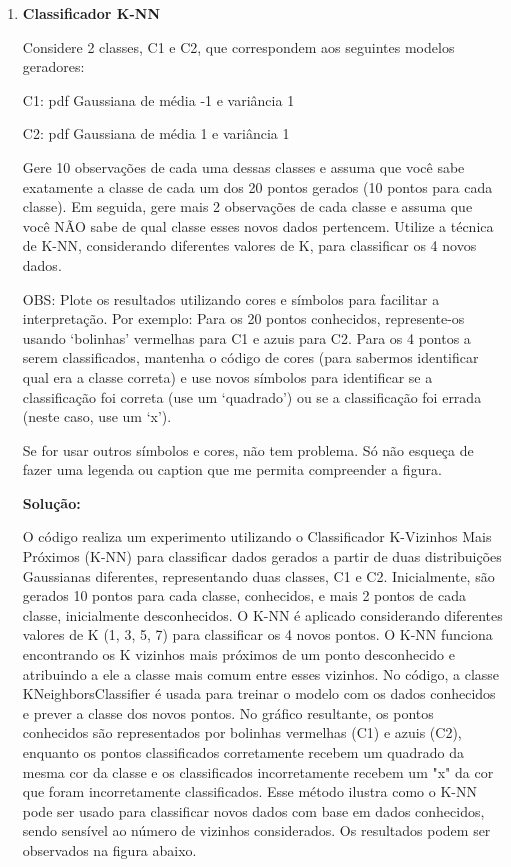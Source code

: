 \begin{enumerate}[label=E\arabic*]

\item \textbf{Classificador K-NN} \par
Considere 2 classes, C1 e C2, que correspondem aos seguintes modelos geradores: 

C1: pdf Gaussiana de média -1 e variância 1

C2: pdf Gaussiana de média 1 e variância 1

Gere 10 observações de cada uma dessas classes e assuma que você sabe exatamente a classe de cada um dos 20 pontos gerados (10 pontos para cada classe). Em seguida, gere mais 2 observações de cada classe e assuma que você NÃO sabe de qual classe esses novos dados pertencem. Utilize a técnica de K-NN, considerando diferentes valores de K, para classificar os 4 novos dados.

OBS: Plote os resultados utilizando cores e símbolos para facilitar a interpretação. Por exemplo: Para os 20 pontos conhecidos, represente-os usando `bolinhas' vermelhas para C1 e azuis para C2. Para os 4 pontos a serem classificados, mantenha o código de cores (para sabermos identificar qual era a classe correta) e use novos símbolos para identificar se a classificação foi correta (use um `quadrado') ou se a classificação foi errada (neste caso, use um `x').

Se for usar outros símbolos e cores, não tem problema. Só não esqueça de fazer uma
legenda ou caption que me permita compreender a figura.


\par
\textbf{Solução:}

O código realiza um experimento utilizando o Classificador K-Vizinhos Mais Próximos (K-NN) para classificar dados gerados a partir de duas distribuições Gaussianas diferentes, representando duas classes, C1 e C2. Inicialmente, são gerados 10 pontos para cada classe, conhecidos, e mais 2 pontos de cada classe, inicialmente desconhecidos. O K-NN é aplicado considerando diferentes valores de K (1, 3, 5, 7) para classificar os 4 novos pontos. O K-NN funciona encontrando os K vizinhos mais próximos de um ponto desconhecido e atribuindo a ele a classe mais comum entre esses vizinhos. No código, a classe KNeighborsClassifier é usada para treinar o modelo com os dados conhecidos e prever a classe dos novos pontos. No gráfico resultante, os pontos conhecidos são representados por bolinhas vermelhas (C1) e azuis (C2), enquanto os pontos classificados corretamente recebem um quadrado da mesma cor da classe e os classificados incorretamente recebem um "x" da cor que foram incorretamente classificados. Esse método ilustra como o K-NN pode ser usado para classificar novos dados com base em dados conhecidos, sendo sensível ao número de vizinhos considerados. Os resultados podem ser observados na figura abaixo.


\end{enumerate}
